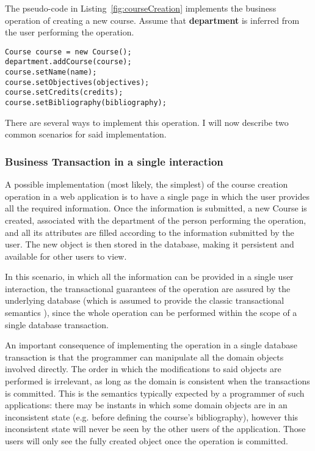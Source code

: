 \documentclass{llncs}
\begin{document}
The pseudo-code in Listing~\ref{fig:courseCreation} implements the
business operation of creating a new course. Assume that {\bf
  department} is inferred from the user performing the operation. 

\begin{lstlisting}
Course course = new Course();
department.addCourse(course);
course.setName(name);
course.setObjectives(objectives);
course.setCredits(credits);
course.setBibliography(bibliography);
\end{lstlisting}

There are several ways to implement this operation. I will now
describe two common scenarios for said implementation.

\subsubsection{Business Transaction in a single interaction}

A possible implementation (most likely, the simplest) of the course
creation operation in a web application is to have a single page in
which the user provides all the required information. Once the
information is submitted, a new Course is created, associated with the
department of the person performing the operation, and all its
attributes are filled according to the information submitted by the
user. The new object is then stored in the database, making it
persistent and available for other users to view.

In this scenario, in which all the information can be provided in a
single user interaction, the transactional guarantees of the operation are
assured by the underlying database (which is assumed to provide the
classic transactional semantics \cite{gray1981transaction}), since the
whole operation can be performed within the scope of a single database
transaction.

An important consequence of implementing the operation in a single
database transaction is that the programmer can manipulate all the domain
objects involved directly. The order in which the modifications to
said objects are performed is irrelevant, as long as the domain is
consistent when the transactions is committed. This is the semantics
typically expected by a programmer of such applications: there may be
instants in which some domain objects are in an inconsistent state
(e.g. before defining the course's bibliography), however this
inconsistent state will never be seen by the other users of the
application. Those users will only see the fully created object once
the operation is committed.
\end{document}
